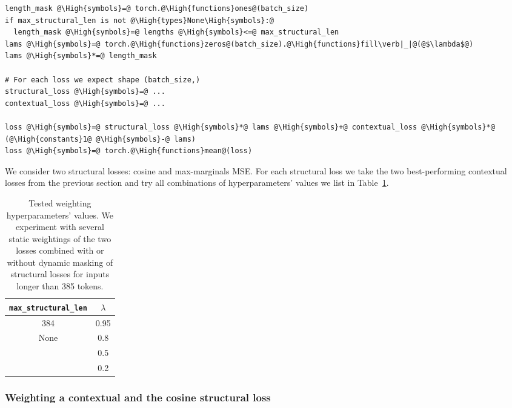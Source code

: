 \bigskip
\begin{lstlisting}
length_mask @\High{symbols}=@ torch.@\High{functions}ones@(batch_size)
if max_structural_len is not @\High{types}None\High{symbols}:@
  length_mask @\High{symbols}=@ lengths @\High{symbols}<=@ max_structural_len
lams @\High{symbols}=@ torch.@\High{functions}zeros@(batch_size).@\High{functions}fill\verb|_|@(@$\lambda$@)
lams @\High{symbols}*=@ length_mask

# For each loss we expect shape (batch_size,)
structural_loss @\High{symbols}=@ ...
contextual_loss @\High{symbols}=@ ...

loss @\High{symbols}=@ structural_loss @\High{symbols}*@ lams @\High{symbols}+@ contextual_loss @\High{symbols}*@ (@\High{constants}1@ @\High{symbols}-@ lams)
loss @\High{symbols}=@ torch.@\High{functions}mean@(loss)
\end{lstlisting}
\bigskip

We consider two structural losses: cosine and max-marginals MSE. For each
structural loss we take the two best-performing contextual losses from the
previous section and try all combinations of hyperparameters' values we list in
Table~\ref{table:weighting_variants}.

\begin{table}
  \centering
  \footnotesize
  \begin{tabular}{cc}
    \toprule
    \texttt{max\_structural\_len} & $\lambda$ \\
    \midrule
    384 & 0.95 \\
    None & 0.8 \\
    & 0.5 \\
    & 0.2 \\
    \bottomrule
  \end{tabular}

  \caption{Tested weighting hyperparameters' values. We experiment with several
  static weightings of the two losses combined with or without dynamic masking
  of structural losses for inputs longer than 385 tokens.}

  \label{table:weighting_variants}

\end{table}

\subsubsection{Weighting a contextual and the cosine structural loss}

